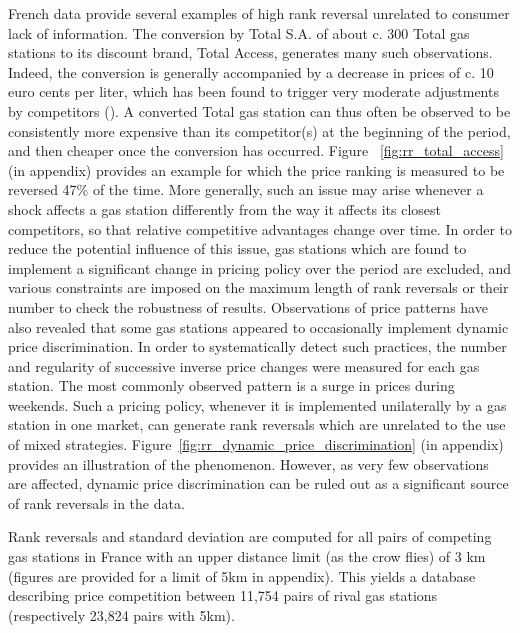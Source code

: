 \documentclass[english]{article}
\begin{document}
French data provide several examples of high rank reversal unrelated to consumer lack of information. The conversion by Total S.A. of about c. 300 Total gas stations to its discount brand, Total Access, generates many such observations. Indeed, the conversion is generally accompanied by a decrease in prices of c. 10 euro cents per liter, which has been found to trigger very moderate adjustments by competitors (\cite{CHA16}). A converted Total gas station can thus often be observed to be consistently more expensive than its competitor(s) at the beginning of the period, and then cheaper once the conversion has occurred. Figure ~\ref{fig:rr_total_access} (in appendix) provides an example for which the price ranking is measured to be reversed 47\% of the time. More generally, such an issue may arise whenever a shock affects a gas station differently from the way it affects its closest competitors, so that relative competitive advantages change over time. In order to reduce the potential influence of this issue, gas stations which are found to implement a significant change in pricing policy over the period are excluded, and various constraints are imposed on the maximum length of rank reversals or their number to check the robustness of results. Observations of price patterns have also revealed that some gas stations appeared to occasionally implement dynamic price discrimination. In order to systematically detect such practices, the number and regularity of successive inverse price changes were measured for each gas station. The most commonly observed pattern is a surge in prices during weekends. Such a pricing policy, whenever it is implemented unilaterally by a gas station in one market, can generate rank reversals which are unrelated to the use of mixed strategies. Figure~\ref{fig:rr_dynamic_price_discrimination} (in appendix) provides an illustration of the phenomenon. However, as very few observations are affected, dynamic price discrimination can be ruled out as a significant source of rank reversals in the data.

Rank reversals and standard deviation are computed for all pairs of competing gas stations in France with an upper distance limit (as the crow flies) of 3 km (figures are provided for a limit of 5km in appendix). This yields a database describing price competition between 11,754 pairs of rival gas stations (respectively 23,824 pairs with 5km).
\end{document}
